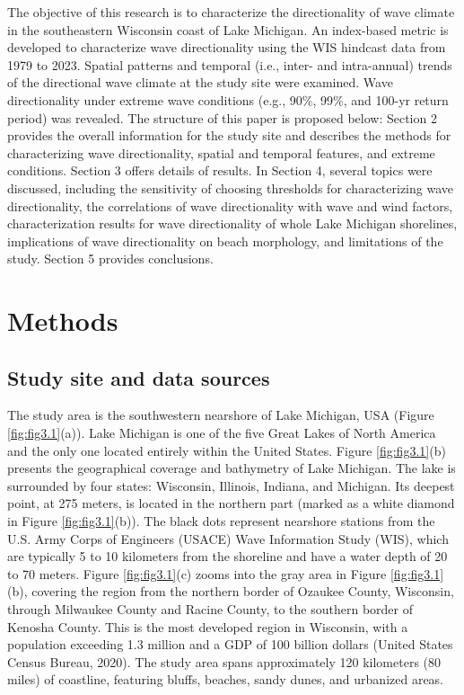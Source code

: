 The objective of this research is to characterize the directionality of wave climate in the southeastern Wisconsin coast of Lake Michigan. An index-based metric is developed to characterize wave directionality using the WIS hindcast data from 1979 to 2023. Spatial patterns and temporal (i.e., inter- and intra-annual) trends of the directional wave climate at the study site were examined. Wave directionality under extreme wave conditions (e.g., 90\%, 99\%, and 100-yr return period) was revealed. The structure of this paper is proposed below: Section 2 provides the overall information for the study site and describes the methods for characterizing wave directionality, spatial and temporal features, and extreme conditions. Section 3 offers details of results. In Section 4, several topics were discussed, including the sensitivity of choosing thresholds for characterizing wave directionality, the correlations of wave directionality with wave and wind factors, characterization results for wave directionality of whole Lake Michigan shorelines, implications of wave directionality on beach morphology, and limitations of the study. Section 5 provides conclusions.

\section{Methods}
\label{c3_Methods}

\subsection{Study site and data sources}
\label{c3_Study site and data sources}
The study area is the southwestern nearshore of Lake Michigan, USA (Figure \ref{fig:fig3.1}(a)). Lake Michigan is one of the five Great Lakes of North America and the only one located entirely within the United States. Figure \ref{fig:fig3.1}(b) presents the geographical coverage and bathymetry of Lake Michigan. The lake is surrounded by four states: Wisconsin, Illinois, Indiana, and Michigan. Its deepest point, at 275 meters, is located in the northern part (marked as a white diamond in Figure \ref{fig:fig3.1}(b)). The black dots represent nearshore stations from the U.S. Army Corps of Engineers (USACE) Wave Information Study (WIS), which are typically 5 to 10 kilometers from the shoreline and have a water depth of 20 to 70 meters. Figure \ref{fig:fig3.1}(c) zooms into the gray area in Figure \ref{fig:fig3.1}(b), covering the region from the northern border of Ozaukee County, Wisconsin, through Milwaukee County and Racine County, to the southern border of Kenosha County. This is the most developed region in Wisconsin, with a population exceeding 1.3 million and a GDP of 100 billion dollars (United States Census Bureau, 2020). The study area spans approximately 120 kilometers (80 miles) of coastline, featuring bluffs, beaches, sandy dunes, and urbanized areas. 

